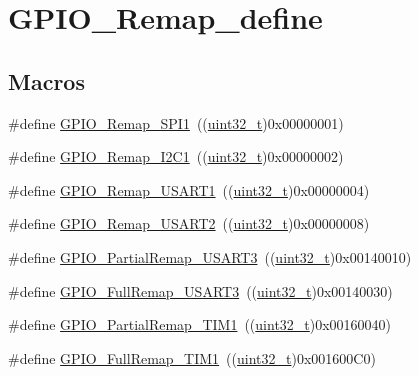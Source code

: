 \hypertarget{group___g_p_i_o___remap__define}{}\section{G\+P\+I\+O\+\_\+\+Remap\+\_\+define}
\label{group___g_p_i_o___remap__define}
\subsection*{Macros}
\begin{DoxyCompactItemize}
\item 
\#define \hyperlink{group___g_p_i_o___remap__define_ga58b02a04a6041954c6e99e681716ab4c}{G\+P\+I\+O\+\_\+\+Remap\+\_\+\+S\+P\+I1}~((\hyperlink{_p_e___types_8h_a33594304e786b158f3fb30289278f5af}{uint32\+\_\+t})0x00000001)
\item 
\#define \hyperlink{group___g_p_i_o___remap__define_ga6cf601e6db62cb2e9dbbccb276401b18}{G\+P\+I\+O\+\_\+\+Remap\+\_\+\+I2\+C1}~((\hyperlink{_p_e___types_8h_a33594304e786b158f3fb30289278f5af}{uint32\+\_\+t})0x00000002)
\item 
\#define \hyperlink{group___g_p_i_o___remap__define_ga804d946c5ca246a1f02f73a086586fd6}{G\+P\+I\+O\+\_\+\+Remap\+\_\+\+U\+S\+A\+R\+T1}~((\hyperlink{_p_e___types_8h_a33594304e786b158f3fb30289278f5af}{uint32\+\_\+t})0x00000004)
\item 
\#define \hyperlink{group___g_p_i_o___remap__define_gaeb2ebb12e23138509af20dce1fc6c246}{G\+P\+I\+O\+\_\+\+Remap\+\_\+\+U\+S\+A\+R\+T2}~((\hyperlink{_p_e___types_8h_a33594304e786b158f3fb30289278f5af}{uint32\+\_\+t})0x00000008)
\item 
\#define \hyperlink{group___g_p_i_o___remap__define_ga97af4aa8dded530353160cca615ad201}{G\+P\+I\+O\+\_\+\+Partial\+Remap\+\_\+\+U\+S\+A\+R\+T3}~((\hyperlink{_p_e___types_8h_a33594304e786b158f3fb30289278f5af}{uint32\+\_\+t})0x00140010)
\item 
\#define \hyperlink{group___g_p_i_o___remap__define_gaa8831190b5b68e9f871955b791fa358b}{G\+P\+I\+O\+\_\+\+Full\+Remap\+\_\+\+U\+S\+A\+R\+T3}~((\hyperlink{_p_e___types_8h_a33594304e786b158f3fb30289278f5af}{uint32\+\_\+t})0x00140030)
\item 
\#define \hyperlink{group___g_p_i_o___remap__define_ga0e94344776c53a76f6e9d933139c05a6}{G\+P\+I\+O\+\_\+\+Partial\+Remap\+\_\+\+T\+I\+M1}~((\hyperlink{_p_e___types_8h_a33594304e786b158f3fb30289278f5af}{uint32\+\_\+t})0x00160040)
\item 
\#define \hyperlink{group___g_p_i_o___remap__define_gaf1f2d5cbc2281b3e3a6cc51c3fe7f77f}{G\+P\+I\+O\+\_\+\+Full\+Remap\+\_\+\+T\+I\+M1}~((\hyperlink{_p_e___types_8h_a33594304e786b158f3fb30289278f5af}{uint32\+\_\+t})0x001600\+C0)

\end{DoxyCompactItemize}
